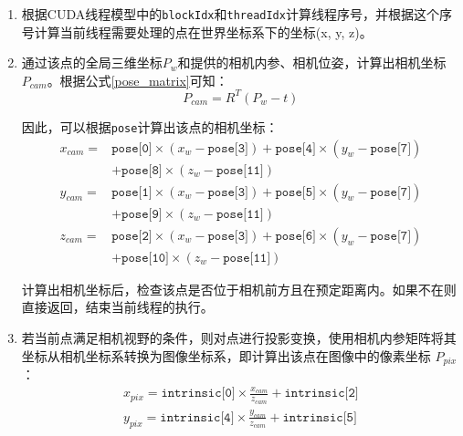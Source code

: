 \begin{enumerate}
	\item 根据CUDA线程模型中的\texttt{blockIdx}和\texttt{threadIdx}计算线程序号，并根据这个序号计算当前线程需要处理的点在世界坐标系下的坐标(x, y, z)。

	\item 通过该点的全局三维坐标$P_w$和提供的相机内参、相机位姿，计算出相机坐标$P_{cam}$。根据公式\ref{pose_matrix}可知：
	      \begin{equation}
		      P_{cam} = R^T(P_w - t)
	      \end{equation}

	      因此，可以根据\texttt{pose}计算出该点的相机坐标：
	      \begin{equation}
		      \begin{aligned}
			      x_{cam} = & \texttt{pose[0]} \times (x_w - \texttt{pose[3]}) + \texttt{pose[4]} \times (y_w - \texttt{pose[7]}) \\
			                & + \texttt{pose[8]} \times (z_w - \texttt{pose[11]})                                                 \\
			      y_{cam} = & \texttt{pose[1]} \times (x_w - \texttt{pose[3]}) + \texttt{pose[5]} \times (y_w - \texttt{pose[7]}) \\
			                & + \texttt{pose[9]} \times (z_w - \texttt{pose[11]})                                                 \\
			      z_{cam} = & \texttt{pose[2]} \times (x_w - \texttt{pose[3]}) + \texttt{pose[6]} \times (y_w - \texttt{pose[7]}) \\
			                & + \texttt{pose[10]} \times (z_w - \texttt{pose[11]})
		      \end{aligned}
		      \label{cam_coordinates}
	      \end{equation}

	      计算出相机坐标后，检查该点是否位于相机前方且在预定距离内。如果不在则直接返回，结束当前线程的执行。

	\item 若当前点满足相机视野的条件，则对点进行投影变换，使用相机内参矩阵将其坐标从相机坐标系转换为图像坐标系，即计算出该点在图像中的像素坐标 $P_{pix}$ ：
	      \begin{equation}
		      \begin{aligned}
			      x_{pix} = \texttt{intrinsic[0]} \times \frac{x_{cam}}{z_{cam}} + \texttt{intrinsic[2]} \\
			      y_{pix} = \texttt{intrinsic[4]} \times \frac{y_{cam}}{z_{cam}} + \texttt{intrinsic[5]}
		      \end{aligned}
	      \end{equation}


\end{enumerate}
